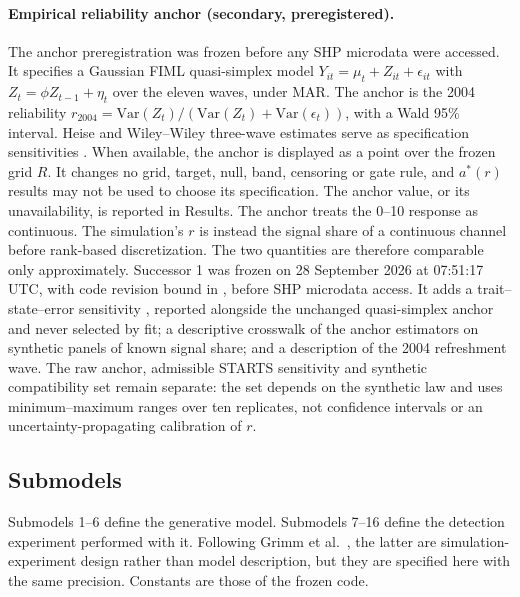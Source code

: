 \paragraph{Empirical reliability anchor (secondary, preregistered).}
The anchor preregistration was frozen before any SHP microdata were accessed. It specifies a Gaussian FIML quasi-simplex model $Y_{it}=\mu_t+Z_{it}+\epsilon_{it}$ with $Z_t=\phi Z_{t-1}+\eta_t$ over the eleven waves, under MAR. The anchor is the 2004 reliability $r_{2004}=\mathrm{Var}(Z_t)/(\mathrm{Var}(Z_t)+\mathrm{Var}(\epsilon_t))$, with a Wald 95\% interval. Heise and Wiley--Wiley three-wave estimates serve as specification sensitivities \cite{heise1969,wiley1970}. When available, the anchor is displayed as a point over the frozen grid $R$. It changes no grid, target, null, band, censoring or gate rule, and $a^*(r)$ results may not be used to choose its specification. The anchor value, or its unavailability, is reported in Results. The anchor treats the 0--10 response as continuous. The simulation's $r$ is instead the signal share of a continuous channel before rank-based discretization. The two quantities are therefore comparable only approximately.
Successor 1 was frozen on 28 September 2026 at 07:51:17 UTC, with code revision  bound in , before SHP microdata access. %
It adds a trait--state--error sensitivity \cite{kenny1995tse}, reported alongside the unchanged quasi-simplex anchor and never selected by fit; a descriptive crosswalk of the anchor estimators on synthetic panels of known signal share; and a description of the 2004 refreshment wave. %
The raw anchor, admissible STARTS sensitivity and synthetic compatibility set remain separate: the set depends on the synthetic law and uses minimum--maximum ranges over ten replicates, not confidence intervals or an uncertainty-propagating calibration of $r$. %

\subsection{Submodels}

Submodels 1--6 define the generative model. Submodels 7--16 define the detection experiment performed with it. Following Grimm et al.\ \cite{grimm2020odd}, the latter are simulation-experiment design rather than model description, but they are specified here with the same precision. Constants are those of the frozen code.


